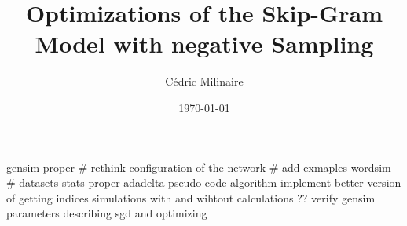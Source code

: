 \documentclass[
    numbers=noenddot,
    parskip=half-,
    fontsize=12pt,
    paper=a4,
    oneside,
    titlepage,
    bibliography=totoc,
    chapterprefix=false,
]{scrbook}
\title{Optimizations of the Skip-Gram Model with negative Sampling}
\author{Cédric Milinaire}
\date{\today}
\begin{document}
\frontmatter

%

\tableofcontents
\newpage



\newpage

%
\newpage
\thispagestyle{empty}
\cleardoublepage
\listoffigures
\newpage

\thispagestyle{empty}
\cleardoublepage
\listoftables
\newpage
\mainmatter
gensim proper \#
rethink configuration of the network  \#
add exmaples wordsim \#  
datasets stats proper 
adadelta 
pseudo code algorithm 
implement better version of getting indices 
simulations with and wihtout calculations ??
verify gensim parameters
describing sgd and optimizing 










%





\newpage


\backmatter

\printbibliography

%
\end{document}
